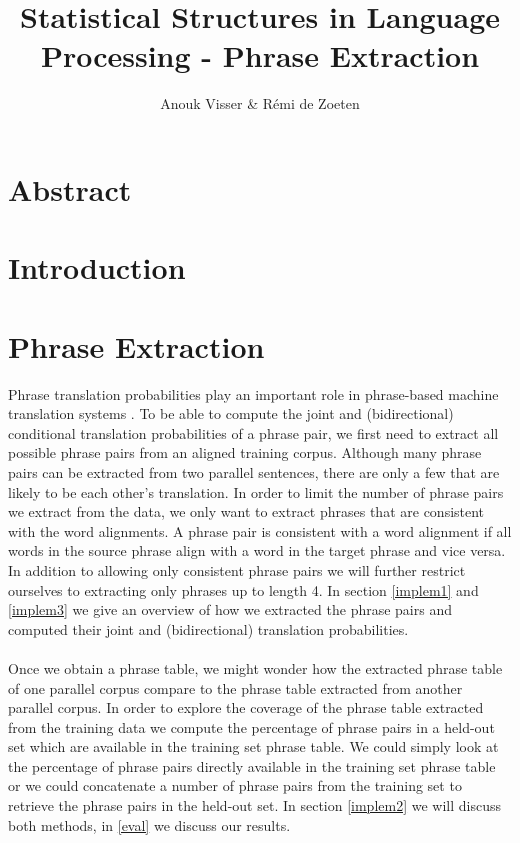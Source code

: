 \documentclass[11pt]{article}
\title{Statistical Structures in Language Processing - Phrase Extraction}
\author{Anouk Visser \& R\'emi de Zoeten}
\date{}                                           %
\begin{document}
\maketitle
\newpage
\tableofcontents
\newpage

\section{Abstract}

\section{Introduction}

\section{Phrase Extraction}
\label{problem}
Phrase translation probabilities play an important role in phrase-based machine translation systems \cite{koehn}. To be able to compute the joint and (bidirectional) conditional translation probabilities of a phrase pair, we first need to extract all possible phrase pairs from an aligned training corpus. Although many phrase pairs can be extracted from two parallel sentences, there are only a few that are likely to be each other's translation. In order to limit the number of phrase pairs we extract from the data, we only want to extract phrases that are consistent with the word alignments. A phrase pair is consistent with a word alignment if all words in the source phrase align with a word in the target phrase and vice versa.  In addition to allowing only consistent phrase pairs we will further restrict ourselves to extracting only phrases up to length 4. In section \ref{implem1} and \ref{implem3} we give an overview of how we extracted the phrase pairs and computed their joint and (bidirectional) translation probabilities.\\\\
Once we obtain a phrase table, we might wonder how the extracted phrase table of one parallel corpus compare to the phrase table extracted from another parallel corpus. In order to explore the coverage of the phrase table extracted from the training data we compute the percentage of phrase pairs in a held-out set which are available in the training set phrase table. We could simply look at the percentage of phrase pairs directly available in the training set phrase table or we could concatenate a number of phrase pairs from the training set to retrieve the phrase pairs in the held-out set. In section \ref{implem2} we will discuss both methods, in \ref{eval} we discuss our results.
\end{document}
